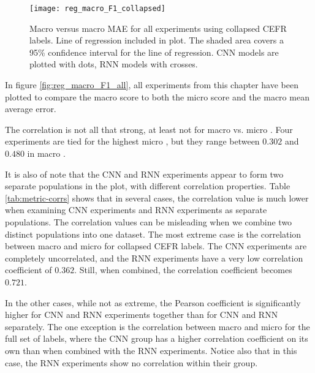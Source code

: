 \begin{figure}
  \centering
  \texttt{[image: reg\_macro\_F1\_collapsed]}
  \caption[Macro \FI versus macro MAE]{
    Macro \FI versus macro MAE for all experiments using collapsed CEFR labels.
    Line of regression included in plot. The shaded area covers a 95\%
    confidence interval for the line of regression. CNN models are plotted with
    dots, RNN models with crosses.
  }
  \label{fig:reg_macro_F1_collapsed}
\end{figure}

In figure \ref{fig:reg_macro_F1_all}, all experiments from this chapter have
been plotted to compare the macro \FI score to both the micro \FI score and
the macro mean average error.

The correlation is not all that strong, at least not for macro \FI vs. micro
\FI. Four experiments are tied for the highest micro \FI, but they range
between $0.302$ and $0.480$ in macro \FI.

It is also of note that the CNN and RNN experiments appear to form two
separate populations in the plot, with different correlation properties.
Table \ref{tab:metric-corrs} shows that in several cases, the correlation
value is much lower when examining CNN experiments and RNN experiments as
separate populations.  The correlation
values can be misleading when we combine two distinct populations into one
dataset. The most extreme case is the correlation between macro \FI and micro
\FI for collapsed CEFR labels. The CNN experiments are completely
uncorrelated, and the RNN experiments have a very low correlation coefficient
of $0.362$. Still, when combined, the correlation coefficient becomes
$0.721$.

In the other cases, while not as extreme, the Pearson coefficient is
significantly higher for CNN and RNN experiments together than for CNN and
RNN separately. The one exception is the correlation between macro \FI and
micro \FI for the full set of labels, where the CNN group has a higher
correlation coefficient on its own than when combined with the RNN
experiments. Notice also that in this case, the RNN experiments show no
correlation within their group.


